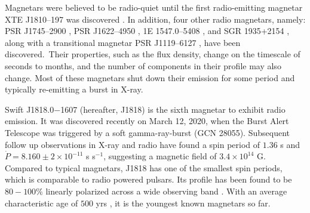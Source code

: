 \documentclass[twocolumn]{emulateapj}
\begin{document}
 
Magnetars were believed to be radio-quiet until the first radio-emitting magnetar XTE J1810--197 was discovered \citep{camilo2006}. In addition, four other radio magnetars, namely: PSR J1745--2900 \citep{eatough2013}, PSR J1622--4950 \citep{levin2010}, 1E 1547.0--5408 \citep{camilo20071e}, and SGR 1935+2154 \citep{zhu2020}, along with a transitional magnetar PSR J1119--6127 \citep{Majid+2017, pearlman2019b}, have been discovered. Their properties, such as the flux density, change on the timescale of seconds to months, and the number of components in their profile may also change. Most of these magnetars shut down their emission for some period and typically re-emitting a burst in X-ray. 

Swift J1818.0$-$1607 (hereafter, J1818) is the sixth magnetar to exhibit radio emission. It was discovered recently on March 12, 2020, when the Burst Alert Telescope was triggered by a soft gamma-ray-burst (GCN 28055). Subsequent follow up observations in X-ray \citep{esposito20} and radio \citep{Champion_2020} have found a spin period of $1.36$ s and $\dot{P} = 8.160 \pm 2 \times 10^{-11}$ s s$^{-1}$, suggesting a magnetic field of $3.4 \times 10^{14}$ G. Compared to typical magnetars, J1818 has one of the smallest spin periods, which is comparable to radio powered pulsars. Its profile has been found to be $80-100 \%$ linearly polarized across a wide observing band \citep{lower2020}. With an average characteristic age of $500$ yrs \citep{Champion_2020}, it is the youngest known magnetars so far. %
\end{document}
